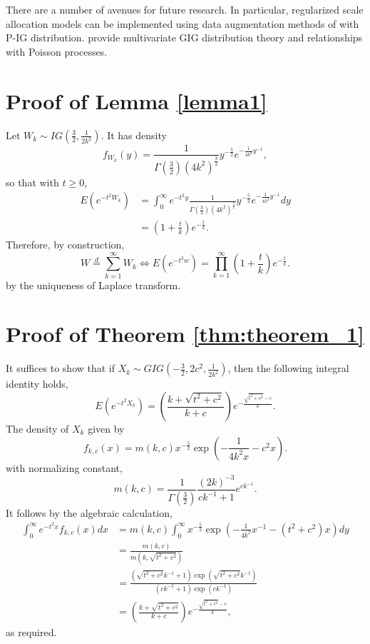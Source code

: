 \documentclass{statsoc}
\begin{document}
There are a number of avenues for future research. In particular, regularized scale allocation models can be implemented using data augmentation methods of \cite{polson2013data} with P-IG distribution. \cite{barndorff1992multivariate} provide multivariate GIG distribution theory and relationships with Poisson processes.


 


\newpage
\appendix
\section{Proof of Lemma \ref{lemma1}}\label{lemma_proof}
Let $W_k \sim IG(\frac{3}{2}, \frac{1}{2k^2})$. It has density 
$$
f_{W_k}(y) = \frac{1}{\Gamma(\frac{3}{2})(4k^2)^{\frac{3}{2}}}  y^{-\frac{5}{2}} e^{-\frac{1}{4k^2} y^{-1}}, 
$$
so that with $t\geq 0$,
\begin{equation*}
\begin{aligned}
E(e^{-t^2 W_k}) &= \int_0^\infty e^{-t^2 y}  \frac{1}{\Gamma(\frac{3}{2})(4k^2)^{\frac{3}{2}}}  y^{-\frac{5}{2}} e^{-\frac{1}{4k^2} y^{-1}} dy\\
&=  \left( 1 + \frac{t}{k} \right) e^{-\frac{t}{k}}.
\end{aligned}
\end{equation*}
Therefore, by construction,
\begin{equation*}
W \overset{d}{=} \sum_{k=1}^\infty W_k
 \Longleftrightarrow E(e^{-t^2 w}) = \prod_{k=1}^\infty \left( 1 + \frac{t}{k} \right) e^{-\frac{t}{k}}.
\end{equation*}
by the uniqueness of Laplace transform.


\section{Proof of Theorem \ref{thm:theorem_1}}\label{proof_thm1}
It suffices to show that if $X_k\sim GIG\left(-\frac{3}{2}, 2c^2, \frac{1}{2k^2}\right)$, then the following integral identity holds, 
$$
E(e^{-t^2 X_k}) = \left( \frac{k + \sqrt{t^2 + c^2}}{k + c} \right) e^{-\frac{\sqrt{t^2 + c^2}-c}{k}}.
$$
The density of $X_k$ given by
$$
f_{k, c}(x) = m\left(k, c\right) x^{-\frac{5}{2}} \exp\left(-\frac{1}{4k^2x}  - c^2x\right).
$$ with normalizing constant, $$m(k, c) = \frac{1}{\Gamma\left(\frac{3}{2}\right)}\frac{ (2k)^{-3}}{c k^{-1} +1}e^{c k^{-1}}.$$ 
It follows by the algebraic calculation,
\begin{align*}
\int_0^\infty e^{-t^2 x} f_{k, c}(x) dx &= m(k, c) \int_0^\infty  x^{-\frac{5}{2}} \exp\left(-\frac{1}{4k^2} x^{-1} -(t^2 + c^2) x\right) dy \\
&= \frac{m(k, c)}{m\left(k, \sqrt{t^2 + c^2}\right)}\\
&= \frac{(\sqrt{t^2 + c^2} k^{-1} +1) \exp\left(\sqrt{t^2 + c^2} k^{-1}\right)}{(c k^{-1} +1)\exp( ck^{-1})}\\
&=  \left( \frac{k + \sqrt{t^2 + c^2}}{k + c} \right) e^{-\frac{\sqrt{t^2 + c^2}-c}{k}},
\end{align*}
as required.
\end{document}

